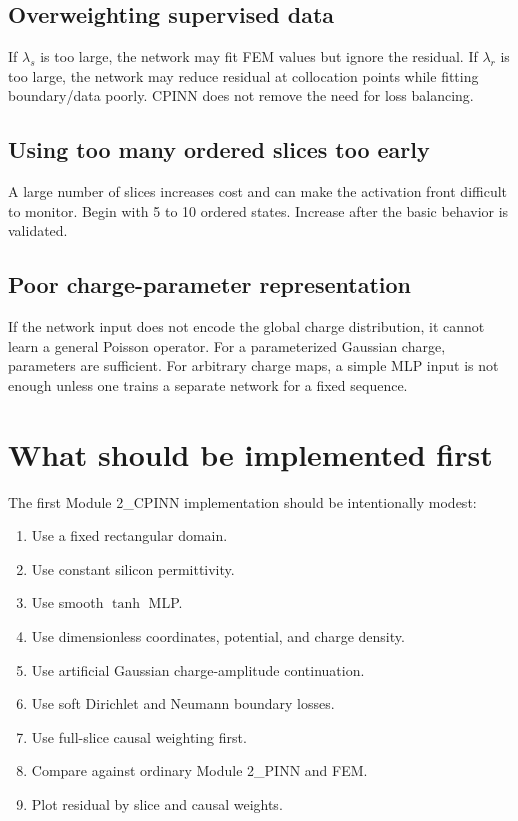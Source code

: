 \documentclass[11pt]{article}
\begin{document}
\subsection{Overweighting supervised data}

If $\lambda_s$ is too large, the network may fit FEM values but ignore the residual. If $\lambda_r$ is too large, the network may reduce residual at collocation points while fitting boundary/data poorly. CPINN does not remove the need for loss balancing.

\subsection{Using too many ordered slices too early}

A large number of slices increases cost and can make the activation front difficult to monitor. Begin with 5 to 10 ordered states. Increase after the basic behavior is validated.

\subsection{Poor charge-parameter representation}

If the network input does not encode the global charge distribution, it cannot learn a general Poisson operator. For a parameterized Gaussian charge, parameters are sufficient. For arbitrary charge maps, a simple MLP input is not enough unless one trains a separate network for a fixed sequence.

\section{What should be implemented first}

The first Module 2\_CPINN implementation should be intentionally modest:
\begin{enumerate}[leftmargin=2em]
\item Use a fixed rectangular domain.
\item Use constant silicon permittivity.
\item Use smooth $\tanh$ MLP.
\item Use dimensionless coordinates, potential, and charge density.
\item Use artificial Gaussian charge-amplitude continuation.
\item Use soft Dirichlet and Neumann boundary losses.
\item Use full-slice causal weighting first.
\item Compare against ordinary Module 2\_PINN and FEM.
\item Plot residual by slice and causal weights.
\end{enumerate}
\end{document}
